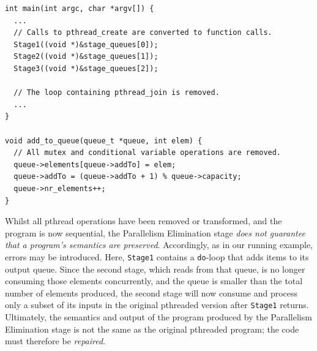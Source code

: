 \begin{lstlisting}[caption=Simple Pipeline Code with Parallelism Removed, frame=single, label=lst:pipeParRem]
int main(int argc, char *argv[]) {
  ...
  // Calls to pthread_create are converted to function calls.
  Stage1((void *)&stage_queues[0]);
  Stage2((void *)&stage_queues[1]);
  Stage3((void *)&stage_queues[2]);
  
  // The loop containing pthread_join is removed.
  ...
}

void add_to_queue(queue_t *queue, int elem) {
  // All mutex and conditional variable operations are removed.
  queue->elements[queue->addTo] = elem;
  queue->addTo = (queue->addTo + 1) % queue->capacity;
  queue->nr_elements++;
}
\end{lstlisting}

\noindent
Whilst all pthread operations have been removed or transformed, and the program is now sequential, the Parallelism Elimination stage \emph{does not guarantee that a program's semantics are preserved}.
%
Accordingly, as in our running example, errors may be introduced.
%
Here, \lstinline|Stage1| contains a \lstinline|do|-loop that adds items to its output queue. Since the second stage, which reads from that queue, is no longer consuming those elements concurrently, and the queue is smaller than the total number of elements produced, the second stage will now consume and process only a subset of its inputs in the original pthreaded version after \lstinline|Stage1| returns.
%
%
Ultimately, the semantics and output of the program produced by the Parallelism Elimination stage is not the same as the original pthreaded program; the code must therefore be \emph{repaired}.



